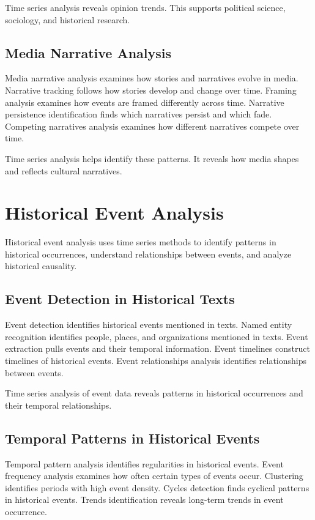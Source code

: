 Time series analysis reveals opinion trends. This supports political science, sociology, and historical research.

\subsection{Media Narrative Analysis}

Media narrative analysis examines how stories and narratives evolve in media. Narrative tracking follows how stories develop and change over time. Framing analysis examines how events are framed differently across time. Narrative persistence identification finds which narratives persist and which fade. Competing narratives analysis examines how different narratives compete over time.

Time series analysis helps identify these patterns. It reveals how media shapes and reflects cultural narratives.

\section{Historical Event Analysis}

Historical event analysis uses time series methods to identify patterns in historical occurrences, understand relationships between events, and analyze historical causality.

\subsection{Event Detection in Historical Texts}

Event detection identifies historical events mentioned in texts. Named entity recognition identifies people, places, and organizations mentioned in texts. Event extraction pulls events and their temporal information. Event timelines construct timelines of historical events. Event relationships analysis identifies relationships between events.

Time series analysis of event data reveals patterns in historical occurrences and their temporal relationships.

\subsection{Temporal Patterns in Historical Events}

Temporal pattern analysis identifies regularities in historical events. Event frequency analysis examines how often certain types of events occur. Clustering identifies periods with high event density. Cycles detection finds cyclical patterns in historical events. Trends identification reveals long-term trends in event occurrence.

